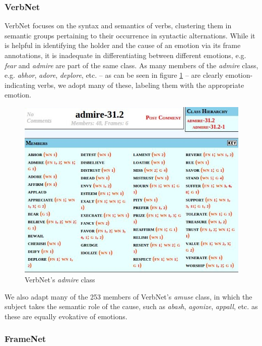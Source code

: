 \subsubsection{VerbNet}

VerbNet \cite{verbnet} focuses on the syntax and semantics of verbs, clustering them in semantic groups pertaining to their occurrence in syntactic alternations. While it is helpful in identifying the holder and the cause of an emotion via its frame annotations, it is inadequate in differentiating between different emotions, e.g. \textit{fear} and \textit{admire} are part of the same class. As many members of the \textit{admire} class, e.g. \textit{abhor}, \textit{adore}, \textit{deplore}, etc. -- as can be seen in figure \ref{fig:admire_class} --  are clearly emotion-indicating verbs, we adopt many of these, labeling them with the appropriate emotion.

\begin{figure}[bth]
\includegraphics[width=\linewidth]{gfx/admire_class.jpg}
\caption{VerbNet's \textit{admire} class}\label{fig:admire_class}
\end{figure}

We also adapt many of the 253 members of VerbNet's \textit{amuse} class, in which the subject takes the semantic role of the cause, such as \textit{abash}, \textit{agonize}, \textit{appall}, etc. as these are equally evokative of emotions.

\subsubsection{FrameNet}

